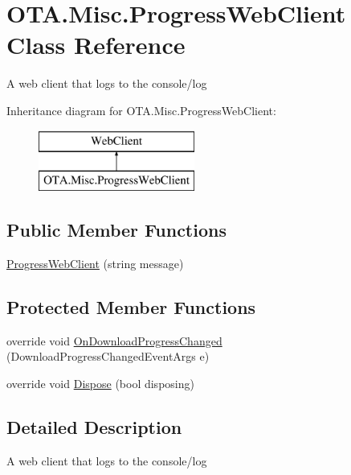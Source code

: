 \hypertarget{class_o_t_a_1_1_misc_1_1_progress_web_client}{}\section{O\+T\+A.\+Misc.\+Progress\+Web\+Client Class Reference}
\label{class_o_t_a_1_1_misc_1_1_progress_web_client}


A web client that logs to the console/log  


Inheritance diagram for O\+T\+A.\+Misc.\+Progress\+Web\+Client\+:\begin{figure}[H]
\begin{center}
\leavevmode
\includegraphics[height=2.000000cm]{class_o_t_a_1_1_misc_1_1_progress_web_client}
\end{center}
\end{figure}
\subsection*{Public Member Functions}
\begin{DoxyCompactItemize}
\item 
\hyperlink{class_o_t_a_1_1_misc_1_1_progress_web_client_a76cdb7d4409ba11d89845c2fc30f4695}{Progress\+Web\+Client} (string message)
\end{DoxyCompactItemize}
\subsection*{Protected Member Functions}
\begin{DoxyCompactItemize}
\item 
override void \hyperlink{class_o_t_a_1_1_misc_1_1_progress_web_client_a186e70ddf3342517f217284977097940}{On\+Download\+Progress\+Changed} (Download\+Progress\+Changed\+Event\+Args e)
\item 
override void \hyperlink{class_o_t_a_1_1_misc_1_1_progress_web_client_a1072ae93fbc66434429b451d40448e9a}{Dispose} (bool disposing)
\end{DoxyCompactItemize}


\subsection{Detailed Description}
A web client that logs to the console/log 



